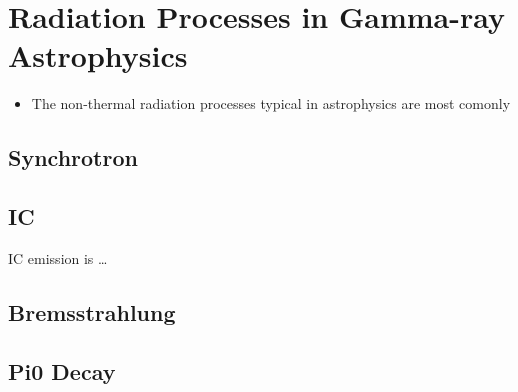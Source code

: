 
\section{Radiation Processes in Gamma-ray Astrophysics}

\begin{itemize}
  \item The non-thermal radiation processes typical
    in astrophysics are most comonly
\end{itemize}

\subsection{Synchrotron}

\subsection{\acl{IC}}

\ac{IC} emission is \ldots

\subsection{Bremsstrahlung}

\subsection{Pi0 Decay}
